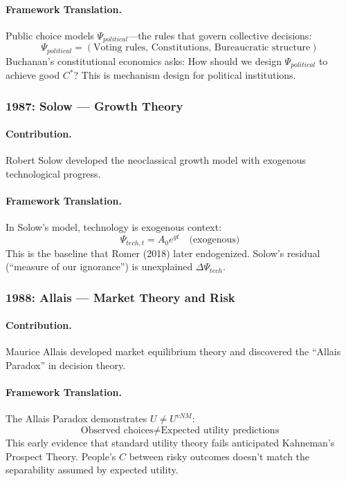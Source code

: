 \paragraph{Framework Translation.}
Public choice models $\Psi_{political}$---the rules that govern collective decisions:
\begin{equation}
  \Psi_{political} = (\text{Voting rules, Constitutions, Bureaucratic structure})
\end{equation}
Buchanan's constitutional economics asks: How should we design $\Psi_{political}$
to achieve good $C^*$? This is mechanism design for political institutions.

\subsubsection{1987: Solow --- Growth Theory}

\paragraph{Contribution.}
Robert Solow developed the neoclassical growth model with exogenous
technological progress.

\paragraph{Framework Translation.}
In Solow's model, technology is exogenous context:
\begin{equation}
  \Psi_{tech,t} = A_0 e^{gt} \quad \text{(exogenous)}
\end{equation}
This is the baseline that Romer (2018) later endogenized.
Solow's residual (``measure of our ignorance'') is unexplained $\Delta \Psi_{tech}$.

\subsubsection{1988: Allais --- Market Theory and Risk}

\paragraph{Contribution.}
Maurice Allais developed market equilibrium theory and discovered
the ``Allais Paradox'' in decision theory.

\paragraph{Framework Translation.}
The Allais Paradox demonstrates $U \neq U^{vNM}$:
\begin{equation}
  \text{Observed choices} \neq \text{Expected utility predictions}
\end{equation}
This early evidence that standard utility theory fails anticipated
Kahneman's Prospect Theory. People's $C$ between risky outcomes
doesn't match the separability assumed by expected utility.


